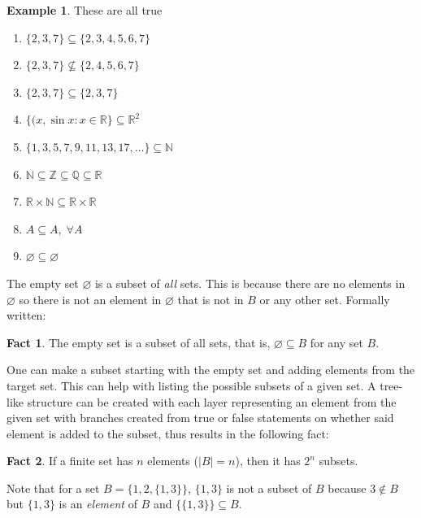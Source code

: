 \documentclass[10pt]{article}
\newcommand{\R}{\mathbb{R}}
\newcommand{\N}{\mathbb{N}}
\newcommand{\Z}{\mathbb{Z}}
\newcommand{\Q}{\mathbb{Q}}
\theoremstyle{definition}
\newtheorem{example}{Example}
\newtheorem{fact}{Fact}
\begin{document}
\begin{example} These are all true
    \begin{enumerate}
        \item $\{2,3,7\} \subseteq \{2,3,4,5,6,7\}$
        \item $\{2,3,7\} \not\subseteq \{2,4,5,6,7\}$
        \item $\{2,3,7\} \subseteq \{2,3,7\}$
        \item $\{(x,\sin{x}: x\in\R\} \subseteq \R^2$
            \item $\{1,3,5,7,9,11,13,17,\dots\} \subseteq \N$
            \item $\N \subseteq \Z \subseteq \Q \subseteq \R$
            \item $\R \times \N \subseteq \R \times \R$
            \item $A \subseteq A, \; \forall A$
            \item $\varnothing \subseteq \varnothing$
        \end{enumerate}
    \end{example}

    The empty set $\varnothing$ is a subset of \textit{all} sets. This is because there are no elements in $\varnothing$ so there is not an element in $\varnothing$ that is not in $B$ or any other set. Formally written:

    \begin{fact}
        The empty set is a subset of all sets, that is, $\varnothing \subseteq B$ for any set $B$.
    \end{fact}

    One can make a subset starting with the empty set and adding elements from the target set. This can help with listing the possible subsets of a given set. A tree-like structure can be created with each layer representing an element from the given set with branches created from true or false statements on whether said element is added to the subset, thus results in the following fact:

    \begin{fact}
        If a finite set has $n$ elements ($|B|=n$), then it has $2^n$ subsets.
    \end{fact}

    Note that for a set $B = \{1,2,\{1,3\}\}$, $\{1,3\}$ is not a subset of $B$ because $3 \not\in B$ but $\{1,3\}$ is an \textit{element} of $B$ and $\{\{1,3\}\} \subseteq B$.
\end{document}
